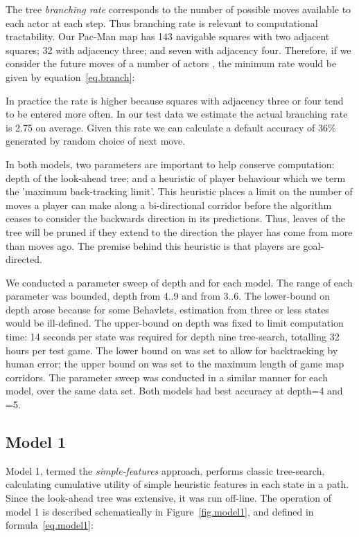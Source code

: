 \documentclass[conference]{IEEEtran}
\begin{document}
The tree \textit{branching rate} corresponds to the number of possible moves available to each actor at each step. Thus branching rate is relevant to computational tractability. Our Pac-Man map has 143 navigable squares with two adjacent squares; 32 with adjacency three; and seven with adjacency four. Therefore, if we consider the future moves of a number of actors , the minimum rate would be given by equation~\ref{eq.branch}:



In practice the rate is higher because squares with adjacency three or four tend to be entered more often. In our test data we estimate the actual branching rate is 2.75 on average. Given this rate we can calculate a default accuracy of 36\% generated by random choice of next move.

In both models, two parameters are important to help conserve computation: depth of the look-ahead tree; and a heuristic of player behaviour which we term the 'maximum back-tracking limit'. This heuristic places a limit  on the number of moves a player can make along a bi-directional corridor before the algorithm ceases to consider the backwards direction in its predictions. Thus, leaves of the tree will be pruned if they extend to the direction the player has come from more than  moves ago. The premise behind this heuristic is that players are goal-directed.

We conducted a parameter sweep of depth and  for each model. The range of each parameter was bounded, depth from 4..9 and  from 3..6. The lower-bound on depth arose because for some Behavlets, estimation from three or less states would be ill-defined. The upper-bound on depth was fixed to limit computation time: 14 seconds per state was required for depth nine tree-search, totalling 32 hours per test game. The lower bound on  was set to allow for backtracking by human error; the upper bound on  was set to the maximum length of game map corridors. The parameter sweep was conducted in a similar manner for each model, over the same data set. Both models had best accuracy at depth=4 and =5.


\subsection{Model 1}
Model 1, termed the \textit{simple-features} approach, performs classic tree-search, calculating cumulative utility of simple heuristic features in each state in a path. Since the look-ahead tree was extensive, it was run off-line. The operation of model 1 is described schematically in Figure~\ref{fig.model1}, and defined in formula~\ref{eq.model1}:
\end{document}
